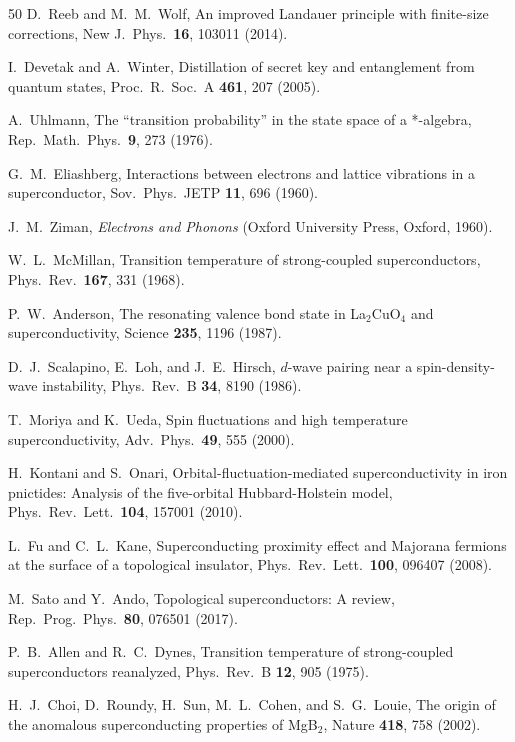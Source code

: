 \documentclass[prb,twocolumn,superscriptaddress,longbibliography,floatfix]{revtex4-2}
\begin{document}
\begin{thebibliography}{50}
D.~Reeb and M.~M.~Wolf,
An improved Landauer principle with finite-size corrections,
New J.\ Phys.\ \textbf{16}, 103011 (2014).

I.~Devetak and A.~Winter,
Distillation of secret key and entanglement from quantum states,
Proc.\ R.\ Soc.\ A \textbf{461}, 207 (2005).

A.~Uhlmann,
The ``transition probability'' in the state space of a *-algebra,
Rep.\ Math.\ Phys.\ \textbf{9}, 273 (1976).

G.~M.~Eliashberg,
Interactions between electrons and lattice vibrations in a superconductor,
Sov.\ Phys.\ JETP \textbf{11}, 696 (1960).

J.~M.~Ziman,
\textit{Electrons and Phonons} (Oxford University Press, Oxford, 1960).

W.~L.~McMillan,
Transition temperature of strong-coupled superconductors,
Phys.\ Rev.\ \textbf{167}, 331 (1968).

P.~W.~Anderson,
The resonating valence bond state in La$_2$CuO$_4$ and superconductivity,
Science \textbf{235}, 1196 (1987).

D.~J.~Scalapino, E.~Loh, and J.~E.~Hirsch,
$d$-wave pairing near a spin-density-wave instability,
Phys.\ Rev.\ B \textbf{34}, 8190 (1986).

T.~Moriya and K.~Ueda,
Spin fluctuations and high temperature superconductivity,
Adv.\ Phys.\ \textbf{49}, 555 (2000).

H.~Kontani and S.~Onari,
Orbital-fluctuation-mediated superconductivity in iron pnictides:
Analysis of the five-orbital Hubbard-Holstein model,
Phys.\ Rev.\ Lett.\ \textbf{104}, 157001 (2010).

L.~Fu and C.~L.~Kane,
Superconducting proximity effect and Majorana fermions at the surface of a topological insulator,
Phys.\ Rev.\ Lett.\ \textbf{100}, 096407 (2008).

M.~Sato and Y.~Ando,
Topological superconductors: A review,
Rep.\ Prog.\ Phys.\ \textbf{80}, 076501 (2017).

P.~B.~Allen and R.~C.~Dynes,
Transition temperature of strong-coupled superconductors reanalyzed,
Phys.\ Rev.\ B \textbf{12}, 905 (1975).

H.~J.~Choi, D.~Roundy, H.~Sun, M.~L.~Cohen, and S.~G.~Louie,
The origin of the anomalous superconducting properties of MgB$_2$,
Nature \textbf{418}, 758 (2002).


\end{thebibliography}
\end{document}
